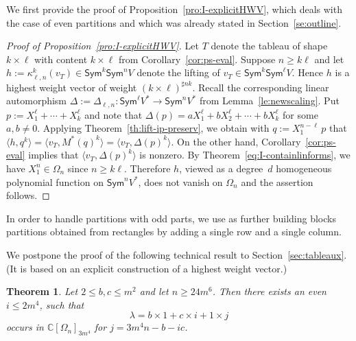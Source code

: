 \documentclass[11pt]{amsart}
\def\Sym{\mathsf{Sym}}
\newcommand{\Det}{\Omega}
\def\la{\lambda}
\newcommand{\IC}{\ensuremath{\mathbb{C}}}
\numberwithin{equation}{section}
\newtheorem{theorem}{Theorem}[section]
\newtheorem{proposition}[theorem]{Proposition}
\begin{document}
We first provide the proof of Proposition~\ref{pro:I-explicitHWV}, which 
deals with the case of even partitions and which was already stated in %
Section~\ref{se:outline}. 



\begin{proof}[Proof of Proposition~\ref{pro:I-explicitHWV}]
Let $T$ denote the tableau of shape $k\times \ell$ with content $k\times \ell$
from Corollary~\ref{cor:ps-eval}. 
Suppose $n\ge k\ell$ and 
let $h := \kappa^k_{\ell,n}(v_T) \in \Sym^k\Sym^n V$ denote the lifting
of $v_T\in\Sym^k\Sym^\ell V$. 
Hence $h$ is a highest weight vector of weight $(k \times \ell)^{\sharp nk}$.  
Recall the corresponding linear automorphism  
$\Delta:=\Delta_{\ell,n}\colon\Sym^{\ell} V^* \to \Sym^{n} V^*$ 
from Lemma~\ref{le:newscaling}. 
Put
$p := X_1^\ell +\cdots+ X_k^\ell$ and note that 
$\Delta(p) = a X_1^\ell + b X_2^\ell + \cdots+ b X_k^\ell$ 
for some $a,b \ne 0$. 
Applying Theorem~\ref{th:lift-ip-preserv}, we obtain with 
$q :=X_1^{n-\ell}\, p$ that 
$\langle h , q^{k} \rangle= \langle v_T , M^*(q)^{k} \rangle  = \langle v_T , \Delta(p)^{k} \rangle$.
On the other hand, Corollary~\ref{cor:ps-eval} implies that  
$\langle v_T , \Delta(p)^{k} \rangle$ is nonzero. 
By Theorem~\ref{eq:I-containlinforms}, 
we have $X_1^{n}\in \Det_n$ since $n\ge k\ell$.
Therefore $h$, viewed as a degree~$d$ homogeneous polynomial function on $\Sym^n V^*$, 
does not vanish on $\Det_n$ and the assertion follows. 
\end{proof}

In order to handle partitions with odd parts, 
we use as further building blocks partitions obtained from 
rectangles by adding a single row and a single column. 

We postpone the proof of the following technical result 
to Section~\ref{sec:tableaux}.  
(It is based on an explicit construction of a highest weight vector.)


\begin{theorem}\label{cor:buildingblock}
Let $2 \leq b,c \leq m^2$ and let $n \geq 24  m^6$.
Then there exists an even $ i \leq 2m^4$, such  that 
\[
\la = b \times 1 + c \times i + 1\times j
\]
occurs in $\mathbb{C}[\Omega_n]_{3m^4}$
for $j = 3m^4n - b - ic$.
\end{theorem}
\end{document}
